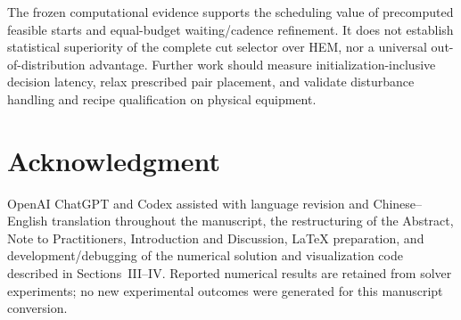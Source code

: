 \documentclass[journal]{IEEEtran}
\begin{document}
The frozen computational evidence supports the scheduling value of precomputed feasible starts and equal-budget waiting/cadence refinement. It does not establish statistical superiority of the complete cut selector over HEM, nor a universal out-of-distribution advantage. Further work should measure initialization-inclusive decision latency, relax prescribed pair placement, and validate disturbance handling and recipe qualification on physical equipment.

\section*{Acknowledgment}
OpenAI ChatGPT and Codex assisted with language revision and Chinese--English translation throughout the manuscript, the restructuring of the Abstract, Note to Practitioners, Introduction and Discussion, LaTeX preparation, and development/debugging of the numerical solution and visualization code described in Sections~III--IV. Reported numerical results are retained from solver experiments; no new experimental outcomes were generated for this manuscript conversion.



\end{document}
